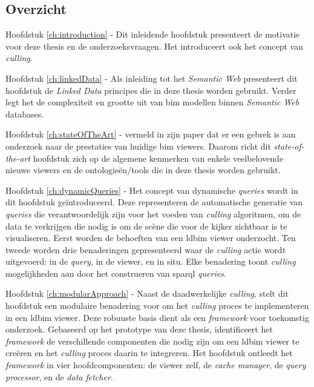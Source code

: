 \begin{refsection}
\begin{multicols}{2}
        \subsection*{Overzicht}
        \textsf{Hoofdstuk \ref{ch:introduction} -}
        Dit inleidende hoofdstuk presenteert de motivatie voor deze thesis en de onderzoeksvraagen. Het introduceert ook het concept van \emph{culling}.

        \textsf{Hoofdstuk \ref{ch:linkedData} -}
        Als inleiding tot het \emph{Semantic Web} presenteert dit hoofdstuk de \emph{Linked Data} principes die in deze thesis worden gebruikt. Verder legt het de complexiteit en grootte uit van \ac{bim} modellen binnen \emph{Semantic Web} databases.

        \textsf{Hoofdstuk \ref{ch:stateOfTheArt} -}
        \cite{Johansson2015} vermeld in zijn paper dat er een gebrek is aan onderzoek naar de prestaties van huidige \ac{bim} viewers. Daarom richt dit \emph{state-of-the-art} hoofdstuk zich op de algemene kenmerken van enkele veelbelovende nieuwe viewers en de ontologieën/tools die in deze thesis worden gebruikt.

        \textsf{Hoofdstuk \ref{ch:dynamicQueries} -}
        Het concept van dynamische \emph{queries} wordt in dit hoofdstuk geïntroduceerd. Deze representeren de automatische generatie van \emph{queries} die verantwoordelijk zijn voor het voeden van \emph{culling} algoritmen, om de data te verkrijgen die nodig is om de scène die voor de kijker zichtbaar is te visualiseren. Eerst worden de behoeften van een \ac{ldbim} viewer onderzocht. Ten tweede worden drie benaderingen gepresenteerd waar de \emph{culling} actie wordt uitgevoerd: in de \emph{query}, in de viewer, en in situ. Elke benadering toont \emph{culling} mogelijkheden aan door het construeren van \ac{sparql} \emph{queries}.

        \textsf{Hoofdstuk \ref{ch:modularApproach} -}
        Naast de daadwerkelijke \emph{culling}, stelt dit hoofdstuk een modulaire benadering voor om het \emph{culling} proces te implementeren in een \ac{ldbim} viewer. Deze robuuste basis dient als een \emph{framework} voor toekomstig onderzoek. Gebaseerd op het prototype van deze thesis, identificeert het \emph{framework} de verschillende componenten die nodig zijn om een \ac{ldbim} viewer te creëren en het \emph{culling} proces daarin te integreren. Het hoofdstuk ontleedt het \emph{framework} in vier hoofdcomponenten: de viewer zelf, de \emph{cache manager}, de \emph{query processor}, en de \emph{data fetcher}.


\end{multicols}
\end{refsection}
